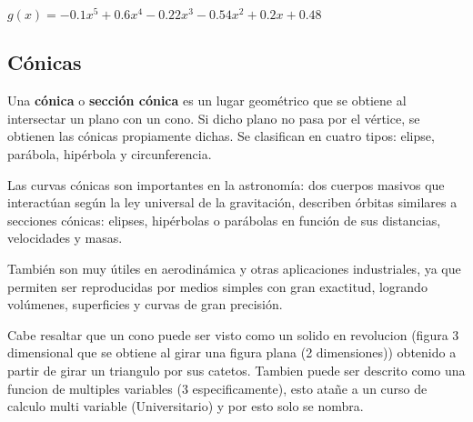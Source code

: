 $g(x)=-0.1x^5+0.6x^4-0.22x^3-0.54x^2+0.2x+0.48$




\subsection{Cónicas}


    Una \textbf{cónica} o \textbf{sección cónica} es un lugar geométrico que se
    obtiene al intersectar un plano con un cono. Si dicho plano no pasa por el
    vértice, se obtienen las cónicas propiamente dichas. Se clasifican en
    cuatro tipos: elipse, parábola, hipérbola y circunferencia.

    Las curvas cónicas son importantes en la astronomía: dos cuerpos masivos
    que interactúan según la ley universal de la gravitación, describen órbitas
    similares a secciones cónicas: elipses, hipérbolas o parábolas en función
    de sus distancias, velocidades y masas.

    También son muy útiles en aerodinámica y otras aplicaciones industriales,
    ya que permiten ser reproducidas por medios simples con gran exactitud,
    logrando volúmenes, superficies y curvas de gran precisión.

    Cabe resaltar que un cono puede ser visto como un solido en revolucion (figura
    3 dimensional que se obtiene al girar una figura plana (2 dimensiones)) obtenido
    a partir de girar un triangulo por sus catetos. Tambien puede ser descrito
    como una funcion de multiples variables (3 especificamente), esto atañe a un
    curso de calculo multi variable (Universitario) y por esto solo se nombra.

